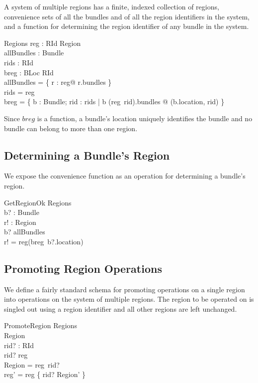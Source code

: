 \documentclass[a4paper,9pt]{article}
\begin{document}
A system of multiple regions has a finite, indexed collection of regions, 
convenience sets of all the bundles and of all the
region identifiers in the system, and a function for
determining the region identifier of any bundle in the system.
\begin{schema}{Regions}
  reg : RId \ffun Region \\
  allBundles : \power Bundle \\
  rids : \power RId \\
  breg : BLoc \pfun RId \\
\where
 allBundles = \bigcup \{ r : \ran reg@ r.bundles \} \\
 rids = \dom reg \\
 breg = \{ b : Bundle; rid : rids | b \in (reg~rid).bundles @ (b.location, rid) \} \\
\end{schema}
Since $breg$ is a function, a bundle's location uniquely identifies the bundle and no bundle
can belong to more than one region.

\subsection{Determining a Bundle's Region}

We expose the convenience function as an operation for determining a bundle's region.
\begin{schema}{GetRegionOk}
  \Xi Regions \\
  b? : Bundle \\
  r! : Region \\
\where
  b? \in allBundles \\
  r! = reg(breg~b?.location) \\
\end{schema}

\subsection{Promoting Region Operations}

We define a fairly standard schema for promoting operations on a single region into
operations on the system of multiple regions.
The region to be operated on is singled out using a region identifier and all other regions are left
unchanged.
\begin{schema}{PromoteRegion}
  \Delta Regions \\
  \Delta Region \\
  rid? : RId \\
\where
  rid? \in \dom reg \\
  \theta Region = reg~rid? \\
  reg' = reg \oplus \{ rid? \mapsto \theta Region' \} \\
\end{schema}
\end{document}
